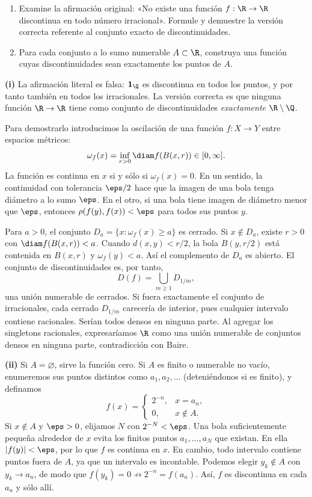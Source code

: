 \begin{ejercicio}
\begin{enumerate}[label=(\roman*)]
\item Examine la afirmación original: «No existe una función $f:\R\to\R$ discontinua en todo número irracional». Formule y demuestre la versión correcta referente al conjunto exacto de discontinuidades.
\item Para cada conjunto a lo sumo numerable $A\subset\R$, construya una función cuyas discontinuidades sean exactamente los puntos de $A$.
\end{enumerate}
\end{ejercicio}
\begin{solucion}
\textbf{(i)} La afirmación literal es falsa: $\mathbf1_{\Q}$ es discontinua en todos los puntos, y por tanto también en todos los irracionales. La versión correcta es que ninguna función $\R\to\R$ tiene como conjunto de discontinuidades \emph{exactamente} $\R\setminus\Q$.

Para demostrarlo introducimos la oscilación de una función $f:X\to Y$ entre espacios métricos:
\[
 \omega_f(x)=\inf_{r>0}\diam f(B(x,r))\in[0,\infty].
\]
La función es continua en $x$ si y sólo si $\omega_f(x)=0$. En un sentido, la continuidad con tolerancia $\eps/2$ hace que la imagen de una bola tenga diámetro a lo sumo $\eps$. En el otro, si una bola tiene imagen de diámetro menor que $\eps$, entonces $\rho(f(y),f(x))<\eps$ para todos sus puntos $y$.

Para $a>0$, el conjunto $D_a=\{x:\omega_f(x)\geq a\}$ es cerrado. Si $x\notin D_a$, existe $r>0$ con $\diam f(B(x,r))<a$. Cuando $d(x,y)<r/2$, la bola $B(y,r/2)$ está contenida en $B(x,r)$ y $\omega_f(y)<a$. Así el complemento de $D_a$ es abierto. El conjunto de discontinuidades es, por tanto,
\[
 D(f)=\bigcup_{m\geq1}D_{1/m},
\]
una unión numerable de cerrados. Si fuera exactamente el conjunto de irracionales, cada cerrado $D_{1/m}$ carecería de interior, pues cualquier intervalo contiene racionales. Serían todos densos en ninguna parte. Al agregar los singletons racionales, expresaríamos $\R$ como una unión numerable de conjuntos densos en ninguna parte, contradicción con Baire.

\textbf{(ii)} Si $A=\varnothing$, sirve la función cero. Si $A$ es finito o numerable no vacío, enumeremos sus puntos distintos como $a_1,a_2,\ldots$ (deteniéndonos si es finito), y definamos
\[
 f(x)=\begin{cases}2^{-n},&x=a_n,\\0,&x\notin A.\end{cases}
\]
Si $x\notin A$ y $\eps>0$, elijamos $N$ con $2^{-N}<\eps$. Una bola suficientemente pequeña alrededor de $x$ evita los finitos puntos $a_1,\ldots,a_N$ que existan. En ella $|f(y)|<\eps$, por lo que $f$ es continua en $x$. En cambio, todo intervalo contiene puntos fuera de $A$, ya que un intervalo es incontable. Podemos elegir $y_k\notin A$ con $y_k\to a_n$, de modo que $f(y_k)=0\not\to2^{-n}=f(a_n)$. Así, $f$ es discontinua en cada $a_n$ y sólo allí.
\end{solucion}


